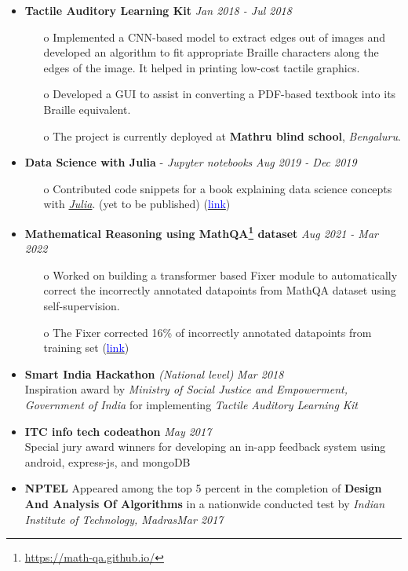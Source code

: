 \documentclass[11pt,a4paper]{article}
\begin{document}
{
\colorbox{gray}{}
\begin{itemize}
    \item \textbf{Tactile Auditory Learning Kit} \hfill \textit{Jan 2018 - Jul 2018}
    \begin{itemize}
        \item[o] Implemented a CNN-based model to extract edges out of images and developed an algorithm to fit appropriate Braille characters along the edges of the image. It helped in printing low-cost tactile graphics.
        \item[o] Developed a GUI to assist in converting a PDF-based textbook into its Braille equivalent. 
        \item[o] The project is currently deployed at \textbf{Mathru blind school}, \emph{Bengaluru}.
    \end{itemize}
    \item \textbf{Data Science with Julia} - \textit{Jupyter notebooks} \hfill \textit{Aug 2019 - Dec 2019}
    \begin{itemize}
        \item[o] Contributed code snippets for a book explaining data science concepts with \href{https://julialang.org}{\emph{Julia}}. (yet to be published) (\href{https://github.com/anushkumarv/Data_Science_with_Julia}{\textcolor{blue}{link}})
    \end{itemize}
    \item \textbf{Mathematical Reasoning using MathQA\footnote{\url{ https://math-qa.github.io/}} dataset} \hfill \textit{Aug 2021 - Mar 2022}
     \begin{itemize}
         \item[o] Worked on building a transformer based Fixer module to automatically correct the incorrectly annotated datapoints from MathQA dataset using self-supervision.
         \item[o] The Fixer corrected 16\% of incorrectly annotated datapoints from training set (\href{https://github.com/anushkumarv/Language_models_explore_numeracy}{\textcolor{blue}{link}}) 
     \end{itemize}   
\end{itemize}
}
{
\colorbox{gray}{}
\begin{itemize}
    \item \textbf{Smart India Hackathon} \textit{(National level)} \hfill \textit{Mar 2018}
    \\Inspiration award by \emph{Ministry of Social Justice and Empowerment, Government of India} for implementing \emph{Tactile Auditory Learning Kit} 
    \item \textbf{ITC info tech codeathon} \hfill \textit{May 2017}
    \\ Special jury award winners for developing an in-app feedback system using android, express-js, and mongoDB
    \item \textbf{NPTEL} Appeared among the top 5 percent in the completion of \textbf{Design And Analysis Of Algorithms} in a nationwide conducted test by \emph{Indian Institute of Technology, Madras}\hfill \textit{Mar 2017}
\end{itemize}
}
  
\end{document}
